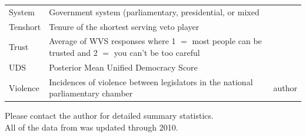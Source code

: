 \documentclass[a4paper]{article}\usepackage[]{graphicx}\usepackage[]{color}
\begin{document}
\begin{table}[!h]
\begin{center}
\begin{tabular}{l m{7cm} m{3.5cm}}
            System & Government system (parliamentary, presidential, or mixed & \cite{DPI2001} \\
            Tenshort & Tenure of the shortest serving veto player & \cite{DPI2001} \\
            Trust & Average of WVS responses where 1 $=$ most people can be trusted and 2 $=$ you can't be too careful & \cite{WVS2009} \\
            UDS & Posterior Mean Unified Democracy Score & \cite{Pemstein2010} \\
            Violence & Incidences of violence between legislators in the national parliamentary chamber & author \\
            \hline

    \end{tabular}
    \end{center}
    \begin{singlespace}
        Please contact the author for detailed summary statistics. \\
        All of the data from \cite{DPI2001} was updated through 2010.
    \end{singlespace}
\end{table}  
\end{document}
